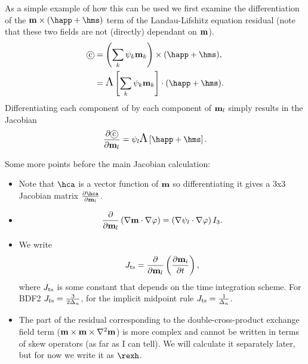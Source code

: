 As a simple example of how this can be used we first examine the differentiation of the $\mv \times (\happ + \hms)$ term of the Landau-Lifshitz equation residual (note that these two fields are not (directly) dependant on $\mathbf{m}$).
\begin{align}
  \circled{c} &= \intpb{\mv} \times (\happ + \hms), \notag\\
  &= \skewm{\intp{\mv}} \cdot (\happ + \hms).
\end{align}
Differentiating each component of  by each component of $\mathbf{m}_l$ simply results in the Jacobian
\begin{align}
  \pd{\circled{c}}{\mv_l} = \sbf_l \skewm{\happ + \hms}.
\end{align}

Some more points before the main Jacobian calculation:

\begin{itemize}
\item Note that $\hca$ is a vector function of $\mathbf{m}$ so differentiating it gives a 3x3 Jacobian matrix  $\pd{\hca}{\mv_l}$.

\item  \begin{equation}
    \frac{\partial }{\partial \mathbf{m}_l} \left(\nabla \mathbf{m} \cdot \nabla \varphi\right) =
    \left(\nabla \psi_l \cdot \nabla \varphi \right) I_3.
  \end{equation}

\item We write
  \begin{equation}
    J_\text{ts} = \frac{\partial }{\partial \mathbf{m}_l} \left(\frac{\partial \mathbf{m}_i}{\partial t} \right),
  \end{equation}
  where $J_\text{ts}$ is some constant that depends on the time integration scheme.
  For BDF2 $J_\text{ts} = \frac{3}{2\Delta_{n}}$, for the implicit midpoint rule $J_\text{ts} = \frac{1}{\Delta_{n}}$.
\item The part of the residual corresponding to the double-cross-product exchange field term ($\mathbf{m} \times \mathbf{m} \times \nabla^2 \mathbf{m}$) is more complex and cannot be written in terms of skew operators (as far as I can tell).
  We will calculate it separately later, but for now we write it as $\rexh$.
\end{itemize}


